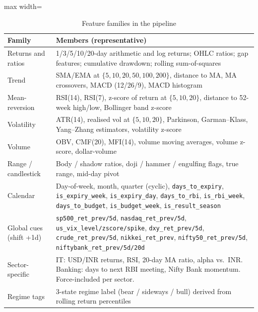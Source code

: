 \begin{table}[H]
\centering
\caption{Feature families in the pipeline}
\label{tab:feature_families}
\renewcommand{\arraystretch}{1.4}
\begin{adjustbox}{max width=\textwidth}
\begin{tabularx}{\textwidth}{l X}
\toprule
\textbf{Family} & \textbf{Members (representative)} \\
\midrule
Returns and ratios       & 1/3/5/10/20-day arithmetic and log returns; OHLC ratios; gap features; cumulative drawdown; rolling sum-of-squares \\
Trend                    & SMA/EMA at $\{5,10,20,50,100,200\}$, distance to MA, MA crossovers, MACD (12/26/9), MACD histogram \\
Mean-reversion           & RSI(14), RSI(7), z-score of return at $\{5,10,20\}$, distance to 52-week high/low, Bollinger band z-score \\
Volatility               & ATR(14), realised vol at $\{5,10,20\}$, Parkinson, Garman--Klass, Yang--Zhang estimators, volatility z-score \\
Volume                   & OBV, CMF(20), MFI(14), volume moving averages, volume z-score, dollar-volume \\
Range / candlestick      & Body / shadow ratios, doji / hammer / engulfing flags, true range, mid-day pivot \\
Calendar                 & Day-of-week, month, quarter (cyclic), \texttt{days\_to\_expiry}, \texttt{is\_expiry\_week}, \texttt{is\_expiry\_day}, \texttt{days\_to\_rbi}, \texttt{is\_rbi\_week}, \texttt{days\_to\_budget}, \texttt{is\_budget\_week}, \texttt{is\_result\_season} \\
Global cues (shift +1d)  & \texttt{sp500\_ret\_prev/5d}, \texttt{nasdaq\_ret\_prev/5d}, \texttt{us\_vix\_level/zscore/spike}, \texttt{dxy\_ret\_prev/5d}, \texttt{crude\_ret\_prev/5d}, \texttt{nikkei\_ret\_prev}, \texttt{nifty50\_ret\_prev/5d}, \texttt{niftybank\_ret\_prev/5d/20d} \\
Sector-specific          & IT: USD/INR returns, RSI, 20-day MA ratio, alpha vs.\ INR. Banking: days to next RBI meeting, Nifty Bank momentum. Force-included per sector. \\
Regime tags              & 3-state regime label (bear / sideways / bull) derived from rolling return percentiles \\
\bottomrule
\end{tabularx}
\end{adjustbox}
\end{table}

